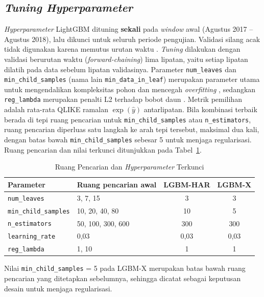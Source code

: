\subsection{\textit{Tuning Hyperparameter}}
\label{subsec:tuning}
\textit{Hyperparameter} LightGBM dituning \textbf{sekali} pada \textit{window}
awal (Agustus 2017 -- Agustus 2018), lalu dikunci untuk seluruh periode
pengujian. Validasi silang acak tidak digunakan karena memutus urutan waktu
\cite{cerqueira2020}. \textit{Tuning} dilakukan dengan validasi berurutan
waktu (\textit{forward-chaining}) lima lipatan, yaitu setiap lipatan dilatih
pada data sebelum lipatan validasinya. Parameter \texttt{num\_leaves} dan \texttt{min\_child\_samples}
(nama lain \texttt{min\_data\_in\_leaf}) merupakan parameter utama untuk
mengendalikan kompleksitas pohon dan mencegah \textit{overfitting}
\cite{lightgbmtuning}, sedangkan \texttt{reg\_lambda} merupakan penalti L2
terhadap bobot daun \cite{chen2016}. Metrik pemilihan adalah rata-rata QLIKE ramalan $\exp(\hat y)$
antarlipatan. Bila kombinasi terbaik berada di tepi ruang pencarian untuk
\texttt{min\_child\_samples} atau \texttt{n\_estimators}, ruang pencarian
diperluas satu langkah ke arah tepi tersebut, maksimal dua kali, dengan batas
bawah \texttt{min\_child\_samples} sebesar 5 untuk menjaga regularisasi. Ruang
pencarian dan nilai terkunci ditunjukkan pada Tabel~\ref{tab:tuning}.

\begin{table}[htbp]
  \caption{Ruang Pencarian dan \textit{Hyperparameter} Terkunci}
  \label{tab:tuning}
  \centering
  \begingroup
  \small
  \begin{tabular}{|l|l|c|c|}
    \hline
    \textbf{Parameter} & \textbf{Ruang pencarian awal} & \textbf{LGBM-HAR} &
    \textbf{LGBM-X} \\
    \hline
    \texttt{num\_leaves} & 3, 7, 15 & 3 & 3 \\
    \hline
    \texttt{min\_child\_samples} & 10, 20, 40, 80 & 10 & 5 \\
    \hline
    \texttt{n\_estimators} & 50, 100, 300, 600 & 300 & 300 \\
    \hline
    \texttt{learning\_rate} & 0,03 & 0,03 & 0,03 \\
    \hline
    \texttt{reg\_lambda} & 1, 10 & 1 & 1 \\
    \hline
  \end{tabular}
  \endgroup
\end{table}

Nilai \texttt{min\_child\_samples} = 5 pada LGBM-X merupakan batas bawah ruang
pencarian yang ditetapkan sebelumnya, sehingga dicatat sebagai keputusan
desain untuk menjaga regularisasi.

